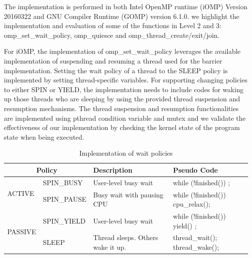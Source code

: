 The implementation is performed in both Intel OpenMP runtime (iOMP) Version 20160322 and GNU Compiler Runtime (GOMP) version 6.1.0. 
we highlight the implementation and evaluation of some of the functions in Level 2 and 3: 
{\sf omp\_set\_wait\_policy}, {\sf omp\_quiesce} and {\sf omp\_thread\_create/exit/join}. 

For iOMP, the implementation of {\sf omp\_set\_wait\_policy} leverages the available 
implementation of suspending and resuming a thread used for the barrier implementation. Setting the 
wait policy of a thread to the {\sf SLEEP} policy is implemented by setting thread-specific variables. For
supporting changing policies to either {\sf SPIN} or {\sf YIELD}, the implementation needs to include codes for 
waking up those threads who are sleeping by using the provided thread suspension and resumption mechanisms.  
The thread suspension and resumption functionalities are implemented using pthread condition variable and mutex and 
we validate the effectiveness of our implementation by checking the kernel state of the program state when being 
executed.

\begin{table}[htbp]
	\centering
\begin{tabular}{|l|l|l|l|} \hline
\multicolumn{2}{|c|}{\textbf{Policy}} & \textbf{Description} & \textbf{Pseudo Code}\\ \hline
\multirow{2}{*}{ACTIVE} & SPIN\_BUSY  & User-level busy wait & while (!finished()) ;  \\ \cline{2-4}
                        & SPIN\_PAUSE & Busy wait with pausing CPU & while (!finished()) cpu\_relax(); \\ \hline
\multirow{2}{*}{PASSIVE}& SPIN\_YIELD & User-level busy wait &  while (!finished()) yield() ;  \\ \cline{2-4}
                      & SLEEP       & Thread sleeps. Others wake it up. & thread\_wait(); thread\_wake();\\ \hline
\end{tabular}
\label{table:implement_wait}
\caption{Implementation of wait policies }
\end{table}


